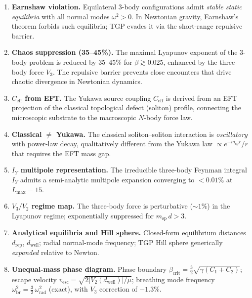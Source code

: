 \begin{enumerate}[nosep]
  \item \textbf{Earnshaw violation.}
        Equilateral 3-body configurations admit \emph{stable static
        equilibria} with all normal modes $\omega^{2}>0$.
        In Newtonian gravity, Earnshaw's theorem forbids such
        equilibria; TGP evades it via the short-range repulsive
        barrier.

  \item \textbf{Chaos suppression (35--45\%).}
        The maximal Lyapunov exponent of the 3-body problem is
        reduced by 35--45\% for $\beta\gtrsim 0.025$, enhanced
        by the three-body force $V_{3}$.  The repulsive barrier
        prevents close encounters that drive chaotic divergence
        in Newtonian dynamics.

  \item \textbf{$C_{\mathrm{eff}}$ from EFT.}
        The Yukawa source coupling $C_{\mathrm{eff}}$ is derived
        from an EFT projection of the classical topological defect
        (soliton) profile, connecting the microscopic substrate
        to the macroscopic $N$-body force law.

  \item \textbf{Classical $\neq$ Yukawa.}
        The classical soliton--soliton interaction is
        \emph{oscillatory} with power-law decay, qualitatively
        different from the Yukawa law $\propto e^{-m_{\mathrm{sp}}r}/r$
        that requires the EFT mass gap.

  \item \textbf{$I_{Y}$ multipole representation.}
        The irreducible three-body Feynman integral $I_{Y}$ admits
        a semi-analytic multipole expansion converging to
        $<0.01\%$ at $L_{\max}=15$.

  \item \textbf{$V_{3}/V_{2}$ regime map.}
        The three-body force is perturbative ($\sim 1\%$) in the
        Lyapunov regime; exponentially suppressed for
        $m_{\mathrm{sp}}\,d > 3$.

  \item \textbf{Analytical equilibria and Hill sphere.}
        Closed-form equilibrium distances $d_{\mathrm{rep}}$,
        $d_{\mathrm{well}}$; radial normal-mode frequency;
        TGP Hill sphere generically \emph{expanded} relative to
        Newton.

  \item \textbf{Unequal-mass phase diagram.}
        Phase boundary
        $\beta_{\mathrm{crit}}=\frac{3}{2}\sqrt{\gamma(C_{1}+C_{2})}$;
        escape velocity
        $v_{\mathrm{esc}}=\sqrt{2|V_{2}(d_{\mathrm{well}})|/\mu}$;
        breathing mode frequency
        $\omega_{\mathrm{br}}^{2}=\frac{3}{2}\,\omega_{\mathrm{rad}}^{2}$
        (exact), with $V_{3}$ correction of $-1.3\%$.
\end{enumerate}

